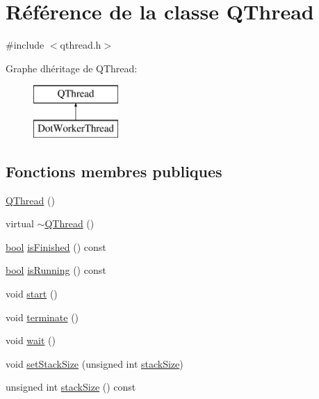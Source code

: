 \hypertarget{class_q_thread}{}\section{Référence de la classe Q\+Thread}
\label{class_q_thread}


{\ttfamily \#include $<$qthread.\+h$>$}

Graphe d\textquotesingle{}héritage de Q\+Thread\+:\begin{figure}[H]
\begin{center}
\leavevmode
\includegraphics[height=2.000000cm]{class_q_thread}
\end{center}
\end{figure}
\subsection*{Fonctions membres publiques}
\begin{DoxyCompactItemize}
\item 
\hyperlink{class_q_thread_a4c49a3f147e0b99829ab49212ba2fb65}{Q\+Thread} ()
\item 
virtual \hyperlink{class_q_thread_a489c8d8398e2122aac635869c77005b3}{$\sim$\+Q\+Thread} ()
\item 
\hyperlink{qglobal_8h_a1062901a7428fdd9c7f180f5e01ea056}{bool} \hyperlink{class_q_thread_a11f25f6dde018aab910d7587069e1c27}{is\+Finished} () const 
\item 
\hyperlink{qglobal_8h_a1062901a7428fdd9c7f180f5e01ea056}{bool} \hyperlink{class_q_thread_a5eb889f893cae68f194646d373a1bec7}{is\+Running} () const 
\item 
void \hyperlink{class_q_thread_a46863abb95653dd33acee1aaa77c35ed}{start} ()
\item 
void \hyperlink{class_q_thread_a0a1310a5a228d6a4fa37484eef5769a5}{terminate} ()
\item 
void \hyperlink{class_q_thread_a113d1bab9ba1efba261153a9d71ca72c}{wait} ()
\item 
void \hyperlink{class_q_thread_ad715dad9f5dd026de4a518affada1aea}{set\+Stack\+Size} (unsigned int \hyperlink{class_q_thread_ab84f5785f80b5099f7ae198b533e459e}{stack\+Size})
\item 
unsigned int \hyperlink{class_q_thread_ab84f5785f80b5099f7ae198b533e459e}{stack\+Size} () const 
\end{DoxyCompactItemize}
